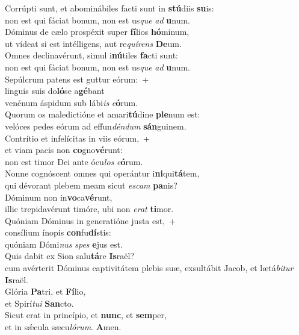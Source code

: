 \evenverse Corrúpti sunt, et abominábiles facti sunt in \textbf{stú}diis \textbf{su}is:~\*\\
\evenverse non est qui fáciat bonum, non est us\textit{que} \textit{ad} \textbf{u}num.\\
\oddverse Dóminus de cælo prospéxit super \textbf{fí}lios \textbf{hó}minum,~\*\\
\oddverse ut vídeat si est intélligens, aut re\textit{quí}\textit{rens} \textbf{De}um.\\
\evenverse Omnes declinavérunt, simul i\textbf{nú}tiles \textbf{fa}cti sunt:~\*\\
\evenverse non est qui fáciat bonum, non est us\textit{que} \textit{ad} \textbf{u}num.\\
\oddverse Sepúlcrum patens est guttur eórum:~+\\
\oddverse  linguis suis do\textbf{ló}se a\textbf{gé}bant~\*\\
\oddverse venénum áspidum sub lábi\textit{is} \textit{e}\textbf{ó}rum.\\
\evenverse Quorum os maledictióne et amari\textbf{tú}dine \textbf{ple}num est:~\*\\
\evenverse velóces pedes eórum ad effun\textit{dén}\textit{dum} \textbf{sán}guinem.\\
\oddverse Contrítio et infelícitas in viis eórum,~+\\
\oddverse  et viam pacis non \textbf{co}gno\textbf{vé}runt:~\*\\
\oddverse non est timor Dei ante ócu\textit{los} \textit{e}\textbf{ó}rum.\\
\evenverse Nonne cognóscent omnes qui operántur i\textbf{ni}qui\textbf{tá}tem,~\*\\
\evenverse qui dévorant plebem meam sicut \textit{e}\textit{scam} \textbf{pa}nis?\\
\oddverse Dóminum non in\textbf{vo}ca\textbf{vé}runt,~\*\\
\oddverse illic trepidavérunt timóre, ubi non \textit{e}\textit{rat} \textbf{ti}mor.\\
\evenverse Quóniam Dóminus in generatióne justa est,~+\\
\evenverse  consílium ínopis \textbf{con}fu\textbf{dí}stis:~\*\\
\evenverse quóniam Dómi\textit{nus} \textit{spes} \textbf{e}jus est.\\
\oddverse Quis dabit ex Sion salu\textbf{tá}re \textbf{Is}raël?~\*\\
\oddverse cum avérterit Dóminus captivitátem plebis suæ, exsultábit Jacob, et lætá\textit{bi}\textit{tur} \textbf{Is}raël.\\
\evenverse Glória \textbf{Pa}tri, et \textbf{Fí}lio,~\*\\
\evenverse et Spirí\textit{tu}\textit{i} \textbf{San}cto.\\
\oddverse Sicut erat in princípio, et \textbf{nunc}, et \textbf{sem}per,~\*\\
\oddverse et in sǽcula sæcu\textit{ló}\textit{rum}. \textbf{A}men.\\
